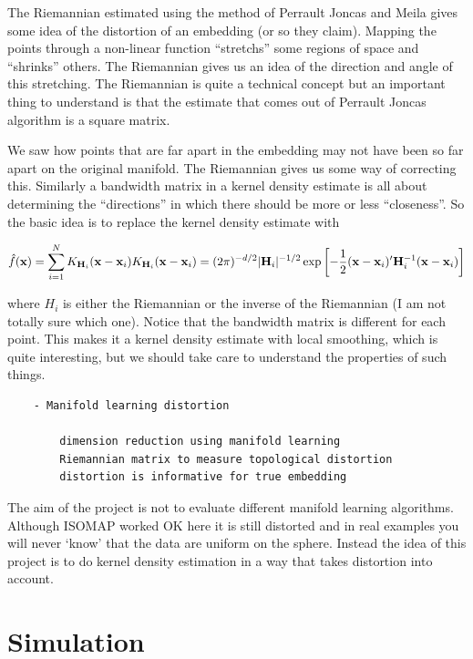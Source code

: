 \documentclass[11pt,a4paper,]{article}
\begin{document}
The Riemannian estimated using the method of Perrault Joncas and Meila gives some idea of the distortion of an embedding (or so they claim). Mapping the points through a non-linear function ``stretchs'' some regions of space and ``shrinks'' others. The Riemannian gives us an idea of the direction and angle of this stretching. The Riemannian is quite a technical concept but an important thing to understand is that the estimate that comes out of Perrault Joncas algorithm is a square matrix.

We saw how points that are far apart in the embedding may not have been so far apart on the original manifold. The Riemannian gives us some way of correcting this. Similarly a bandwidth matrix in a kernel density estimate is all about determining the ``directions'' in which there should be more or less ``closeness''. So the basic idea is to replace the kernel density estimate with

\[
\hat{f}(\mathbf{x})=\sum\limits_{i=1}^N K_{\mathbf{H}_i}(\mathbf{x}-\mathbf{x}_i)\\
K_{\mathbf{H}_i}(\mathbf{x}-\mathbf{x}_i)=(2\pi)^{-d/2}|\mathbf{H}_i|^{-1/2}\exp\left[-\frac{1}{2}(\mathbf{x}-\mathbf{x}_i)'\mathbf{H}_i^{-1}(\mathbf{x}-\mathbf{x}_i)\right]
\]

where \(H_i\) is either the Riemannian or the inverse of the Riemannian (I am not totally sure which one). Notice that the bandwidth matrix is different for each point. This makes it a kernel density estimate with local smoothing, which is quite interesting, but we should take care to understand the properties of such things.\\

\begin{verbatim}
    - Manifold learning distortion

        dimension reduction using manifold learning
        Riemannian matrix to measure topological distortion
        distortion is informative for true embedding
\end{verbatim}

The aim of the project is not to evaluate different manifold learning algorithms. Although ISOMAP worked OK here it is still distorted and in real examples you will never `know' that the data are uniform on the sphere. Instead the idea of this project is to do kernel density estimation in a way that takes distortion into account.

\hypertarget{simulation}{%
\section{Simulation}\label{simulation}}
\end{document}
